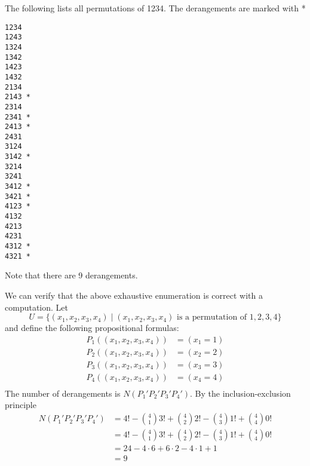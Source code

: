 The following lists all permutations of 1234.
The derangements are marked with *

\begin{Verbatim}[frame=single,fontsize=\footnotesize]
1234
1243
1324
1342
1423
1432
2134 
2143 *
2314 
2341 *
2413 *
2431 
3124 
3142 *
3214 
3241 
3412 *
3421 *
4123 * 
4132 
4213 
4231 
4312 *
4321 *
\end{Verbatim}
Note that there are 9 derangements.

We can verify that the above exhaustive enumeration is correct
with a computation.
Let
\[
U = \{(x_1, x_2, x_3, x_4) \mid (x_1, x_2, x_3, x_4) \text{ is a permutation  of $1,2,3,4$} \}
\]
and define the following propositional formulas:
\begin{align*}
P_1((x_1, x_2, x_3, x_4)) &= (x_1 = 1) \\
P_2((x_1, x_2, x_3, x_4)) &= (x_2 = 2) \\
P_3((x_1, x_2, x_3, x_4)) &= (x_3 = 3) \\
P_4((x_1, x_2, x_3, x_4)) &= (x_4 = 4) \\
\end{align*}
The number of derangements is $N(P_1' P_2' P_3' P_4')$.
By the inclusion-exclusion principle
\begin{align*}
N(P_1' P_2' P_3' P_4')
&= 4! - \binom{4}{1}3! + \binom{4}{2}2! - \binom{4}{3}1! + \binom{4}{4}0! \\
&= 4! - \binom{4}{1}3! + \binom{4}{2}2! - \binom{4}{3}1! + \binom{4}{4}0! \\
&= 24 - 4 \cdot 6 + 6 \cdot 2 - 4 \cdot 1 + 1 \\
&= 9
\end{align*}
